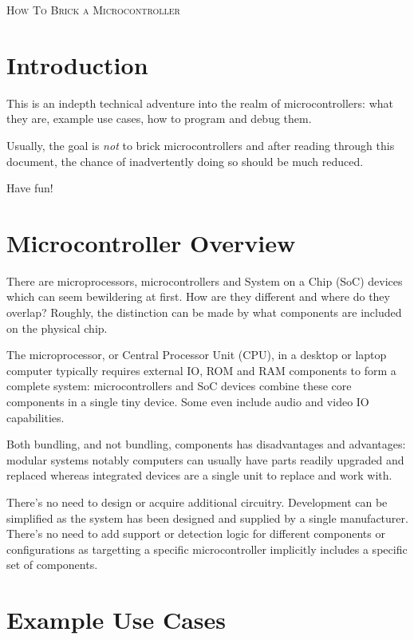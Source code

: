 \documentclass[a4paper,11pt]{article}
\begin{document}
\begin{titlepage}
\raggedleft
{\Huge\scshape How To Brick a Microcontroller}
\end{titlepage}

\section{Introduction}

This is an indepth technical adventure into the realm of microcontrollers: what
they are, example use cases, how to program and debug them.

Usually, the goal is \emph{not} to brick microcontrollers and after reading
through this document, the chance of inadvertently doing so should be much
reduced.

Have fun!

\section{Microcontroller Overview}

There are microprocessors, microcontrollers and System on a Chip (SoC) devices
which can seem bewildering at first. How are they different and where do they
overlap?  Roughly, the distinction can be made by what components are included
on the physical chip.

The microprocessor, or Central Processor Unit (CPU), in a desktop or laptop
computer typically requires external IO, ROM and RAM components to form a
complete system: microcontrollers and SoC devices combine these core components
in a single tiny device. Some even include audio and video IO capabilities.

Both bundling, and not bundling, components has disadvantages and advantages:
modular systems notably computers can usually have parts readily upgraded and
replaced whereas integrated devices are a single unit to replace and work with.

There's no need to design or acquire additional circuitry. Development can be
simplified as the system has been designed and supplied by a single
manufacturer. There's no need to add support or detection logic for different
components or configurations as targetting a specific microcontroller
implicitly includes a specific set of components.

\section{Example Use Cases}
\end{document}
